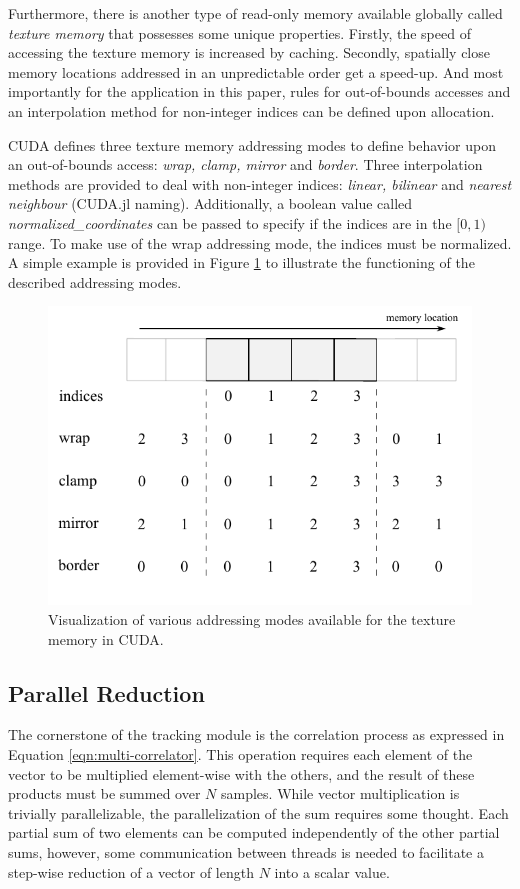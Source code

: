\documentclass{juliacon}
\begin{document}
Furthermore, there is another type of read-only memory available globally called \emph{texture memory} that possesses some unique properties. Firstly, the speed of accessing the texture memory is increased by caching. Secondly, spatially close memory locations addressed in an unpredictable order get a speed-up. And most importantly for the application in this paper, rules for out-of-bounds accesses and an interpolation method for non-integer indices can be defined upon allocation.

CUDA defines three texture memory addressing modes to define behavior upon an out-of-bounds access: \emph{wrap, clamp, mirror} and \emph{border}. Three interpolation methods are provided to deal with non-integer indices: \emph{linear, bilinear} and \emph{nearest neighbour} (CUDA.jl naming). Additionally, a boolean value called \emph{normalized\_coordinates} can be passed to specify if the indices are in the $[0, 1)$ range. To make use of the wrap addressing mode, the indices must be normalized. A simple example is provided in Figure \ref{fig:textmem} to illustrate the functioning of the described addressing modes.
\begin{figure}
    \centering
    \includegraphics[scale = 0.8]{figures/texture-memory.pdf}
    \caption{\label{fig:textmem}Visualization of various addressing modes available for the texture memory in CUDA.}
\end{figure}

\subsection*{Parallel Reduction}
The cornerstone of the tracking module is the correlation process as expressed in Equation \ref{eqn:multi-correlator}. This operation requires each element of the vector to be multiplied element-wise with the others, and the result of these products must be summed over $N$ samples. While vector multiplication is trivially parallelizable, the parallelization of the sum requires some thought. Each partial sum of two elements can be computed independently of the other partial sums, however, some communication between threads is needed to facilitate a step-wise reduction of a vector of length $N$ into a scalar value. 
\end{document}
